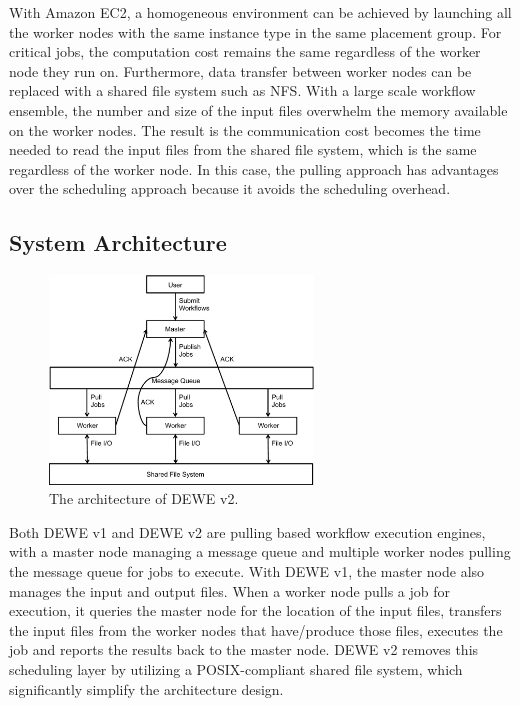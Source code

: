 With Amazon EC2, a homogeneous environment can be achieved by launching all the worker nodes with the same instance type in the same placement group. For critical jobs, the computation cost remains the same regardless of the worker node they run on. Furthermore, data transfer between worker nodes can be replaced with a shared file system such as NFS. With a large scale workflow ensemble, the number and size of the input files overwhelm the memory available on the worker nodes. The result is the communication cost becomes the time needed to read the input files from the shared file system, which is the same regardless of the worker node. In this case, the pulling approach has advantages over the scheduling approach because it avoids the scheduling overhead.


\subsection{System Architecture}
\label{sec:subsec:system_architecture}

\begin{figure}[!t]
	\centering
	\hspace{-5pt}
	\includegraphics[width=7cm]{dewe_v2_architecture}
    \vspace{5pt}
	\caption{The architecture of DEWE v2.}
	\label{fig:dewe_v2_architecture}
\end{figure}


Both DEWE v1 and DEWE v2 are pulling based workflow execution engines, with a master node managing a message queue and multiple worker nodes pulling the message queue for jobs to execute. With DEWE v1, the master node also manages the input and output files. When a worker node pulls a job for execution, it queries the master node for the location of the input files, transfers the input files from the worker nodes that have/produce those files, executes the job and reports the results back to the master node. DEWE v2 removes this scheduling layer by utilizing a POSIX-compliant shared file system, which significantly simplify the architecture design. 




